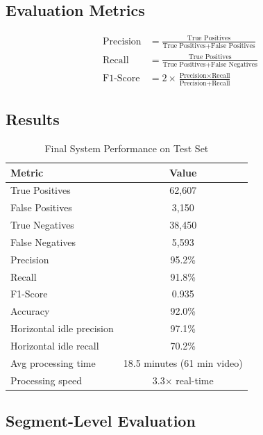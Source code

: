 \documentclass[11pt,a4paper]{article}
\begin{document}
\subsection{Evaluation Metrics}

\begin{align}
\text{Precision} &= \frac{\text{True Positives}}{\text{True Positives} + \text{False Positives}} \\
\text{Recall} &= \frac{\text{True Positives}}{\text{True Positives} + \text{False Negatives}} \\
\text{F1-Score} &= 2 \times \frac{\text{Precision} \times \text{Recall}}{\text{Precision} + \text{Recall}}
\end{align}

\subsection{Results}

\begin{table}[htbp]
\centering
\caption{Final System Performance on Test Set}
\begin{tabular}{@{}lc@{}}
\toprule
\textbf{Metric} & \textbf{Value} \\ \midrule
True Positives & 62,607 \\
False Positives & 3,150 \\
True Negatives & 38,450 \\
False Negatives & 5,593 \\
\midrule
Precision & 95.2\% \\
Recall & 91.8\% \\
F1-Score & 0.935 \\
Accuracy & 92.0\% \\
\midrule
Horizontal idle precision & 97.1\% \\
Horizontal idle recall & 70.2\% \\
\midrule
Avg processing time & 18.5 minutes (61 min video) \\
Processing speed & 3.3$\times$ real-time \\
\bottomrule
\end{tabular}
\end{table}

\subsection{Segment-Level Evaluation}
\end{document}

